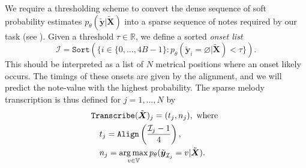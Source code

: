 We require a thresholding scheme to convert the dense sequence of soft probability estimates $p_\theta(\tilde{\bm{y}}|\tilde{\bm{X}})$ into a sparse sequence of notes required by our task (see ). Given a threshold $\tau\in\mathbb{R}$, we define a sorted \emph{onset list}
\[
\mathcal{I} = \texttt{Sort}(\{i \in \{0,\dots,4B-1\} : p_\theta(\tilde{\bm{y}}_i = \varnothing|\tilde{\bm{X}}) < \tau\}).
\]
This should be interpreted as a list of $N$ metrical positions where an onset likely occurs. The timings of these onsets are given by the alignment, and we will predict the note-value with the highest probability. The sparse melody transcription is thus defined for $j=1,\dots,N$ by
\begin{align*}
&\texttt{Transcribe}(\tilde{\mbox{\boldmath{$X$}}})_j = (t_j,n_j),\text{ where }\\
&\quad t_j = \texttt{Align}\left(\frac{\mathcal{I}_j-1}{4}\right),\\
&\quad n_j = \operatorname*{arg\,max}_{v\in\mathbb{V}} p_\theta(\tilde{\mbox{\boldmath{$y$}}}_{\mathcal{I}_j} = v|\tilde{\mbox{\boldmath{$X$}}}).
\end{align*}